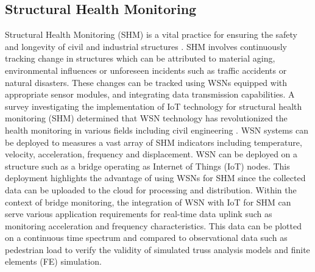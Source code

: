 \subsection{Structural Health Monitoring}
Structural Health Monitoring (SHM) is a vital practice for ensuring the safety and longevity of civil and industrial structures \cite{SHM-IoT-Magazine}. SHM involves continuously tracking change in structures which can be attributed to material aging, environmental influences or unforeseen incidents such as traffic accidents or natural disasters. These changes can be tracked using WSNs equipped with appropriate sensor modules, and integrating data transmission capabilities. A survey investigating the implementation of IoT technology for structural health monitoring (SHM) determined that WSN technology has revolutionized the health monitoring in various fields including civil engineering \cite{SHM-IoT-Survey}. WSN  systems can be deployed to measures a vast array of SHM indicators including temperature, velocity, acceleration, frequency and displacement. WSN can be deployed on a structure such as a bridge operating as Internet of Things (IoT) nodes. This deployment highlights the advantage of using WSNs for SHM since the collected data can be uploaded to the cloud for processing and distribution. Within the context of bridge monitoring, the integration of WSN with IoT for SHM can serve various application requirements for real-time data uplink such as monitoring acceleration and frequency characteristics. This data can be plotted on a continuous time spectrum and compared to observational data such as pedestrian load to verify the validity of  simulated truss analysis models and finite elements (FE) simulation. 

